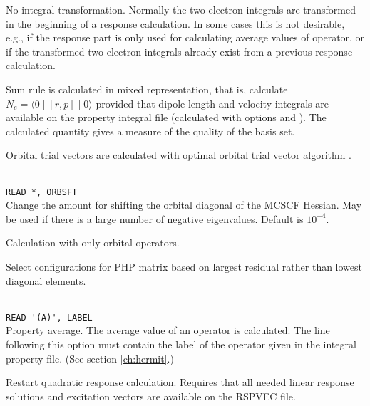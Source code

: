 \begin{description}
\item{}
No integral transformation. Normally the two-electron integrals are 
transformed in the beginning of a response calculation. In some cases
this is not desirable, e.g., if the response part is only used for
calculating average values of operator, or if the transformed two-electron
integrals already exist from a previous response calculation. 

\item{}
Sum rule is calculated in mixed representation, that is, calculate
$N_e=\langle0\mid [r,p] \mid0\rangle$ provided that dipole length and
velocity integrals are available on the property integral file 
(calculated with  options  and ).
The calculated quantity gives a measure of the quality of the basis
set.

\item{}
Orbital trial vectors are calculated with optimal orbital
trial vector
algorithm \cite{tuhjahjajpjjcp84}.

\item{}\\
\verb|READ *, ORBSFT|\\
Change the amount for shifting the orbital
diagonal of the MCSCF Hessian.
May be used if there is a large number of negative eigenvalues.
Default is $10^{-4}$. 

\item{}
Calculation with only orbital operators. 

\item{}
Select configurations for PHP matrix based on largest residual
rather than lowest diagonal elements.

\item{} \\
\verb|READ '(A)', LABEL|\\
Property average. The average value of an
operator is calculated. 
The line following this option must contain the
label of the operator given in the integral property file.
(See section \ref{ch:hermit}.)

\item{}
Restart quadratic response
calculation.
Requires that all needed linear response solutions and excitation vectors
are available on the RSPVEC file.
\end{description}

